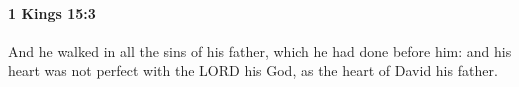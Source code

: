 
		\paragraph{1 Kings 15:3} %
			\label{1KINGS-15-3}

			And he walked in all the sins of his father, which he had done before him: and his heart was not perfect with the LORD his God, as the heart of David his father.


